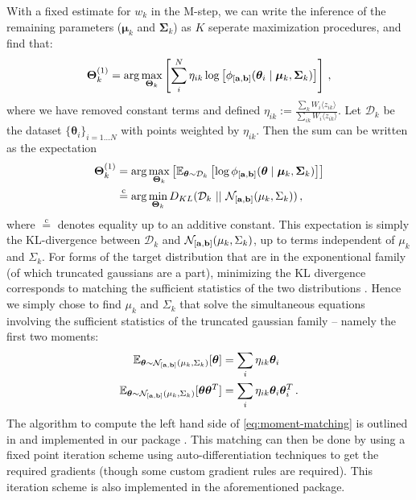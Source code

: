 \documentclass[twocolumn,usenames,dvipsnames,linenumbers]{aastex631}
\newcommand{\btheta}{\boldsymbol{\theta}}
\newcommand{\bmu}{\boldsymbol{\mu}}
\newcommand{\bSigma}{\boldsymbol{\Sigma}}
\newcommand{\ba}{{\bf a}}
\newcommand{\bb}{{\bf b}}
\newcommand{\bTheta}{\boldsymbol{\Theta}}
\newcommand{\zik}{\langle z_{ik}\rangle }
\begin{document}
With a fixed estimate for $w_k$ in the M-step, we can write the inference of the remaining parameters ($\bmu_k$ and $\bSigma_k$) as $K$ seperate maximization procedures, and find that:
\begin{equation}
	\begin{aligned}
		\bTheta^{(1)}_k = \arg \max_{\bTheta_k}  \left[\sum_i^N \eta_{ik} \log \left[\phi_{[\ba, \bb]}(\btheta_i \mid \bmu_k, \bSigma_k)\right]\right]\,,
	\end{aligned}
\end{equation}
where we have removed constant terms and defined $\eta_{ik} := \frac{\sum_k W_i \zik}{\sum_{ik} W_i \zik}$. 
Let $\mathcal{D}_k$ be the dataset $\{\btheta_i\}_{i=1\dots N}$ with points weighted by $\eta_{ik}$. Then the sum can be written as the expectation
\begin{equation}
	\begin{aligned}
		\bTheta^{(1)}_k &= \arg \max_{\bTheta_k}  \left[\mathbb{E}_{\btheta \sim \mathcal{D}_k} \left[\log\phi_{[\ba, \bb]}(\btheta \mid \bmu_k, \bSigma_k)\right]\right] \\ &\overset{\mathrm{c}}{=}  \arg \min_{\bTheta_k} D_{KL}(\mathcal{D}_k\ ||\  \mathcal{N}_{[\ba,\bb]}(\mu_k, \Sigma_k))\,,
	\end{aligned}
\end{equation}
where $\overset{\mathrm{c}}{=}$ denotes equality up to an additive constant. This expectation is simply the KL-divergence between $\mathcal{D}_k$ and $\mathcal{N}_{[\ba,\bb]}(\mu_k, \Sigma_k)$, up to terms independent of $\mu_k$ and $\Sigma_k$.
For forms of the target distribution that are in the exponentional family (of which truncated gaussians are a part), minimizing the KL divergence corresponds to matching the sufficient statistics of the two distributions \citep{amari2000methods}. 
Hence we simply chose to find $\mu_k$ and $\Sigma_k$ that solve the simultaneous equations involving the sufficient statistics of the truncated gaussian family -- namely the first two moments:
\begin{equation}
	\begin{aligned}
		\mathbb{E}_{\btheta \sim \mathcal{N}_{[\ba,\bb]}(\mu_k, \Sigma_k)}[\btheta] &=\sum_i \eta_{ik} \btheta_i \\
		\mathbb{E}_{\btheta \sim \mathcal{N}_{[\ba,\bb]}(\mu_k, \Sigma_k)}[\btheta\btheta^T] &= \sum_i \eta_{ik} \btheta_i\btheta_i^T\,.
	\end{aligned}
	\label{eq:moment-matching}
\end{equation}
The algorithm to compute the left hand side of \eqref{eq:moment-matching} is outlined in \cite{Lee2012} and implemented in our package \cite{truncatedgaussianmixtures}. This matching can then be done by using a fixed point iteration scheme using auto-differentiation techniques to get the required gradients (though some custom gradient rules are required). This iteration scheme is also implemented in the aforementioned package.
\end{document}
